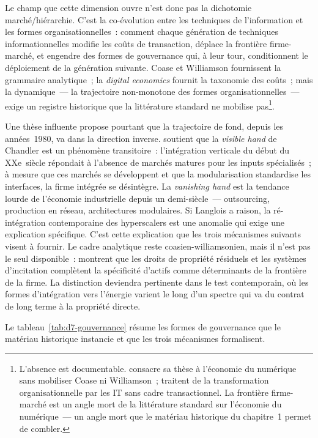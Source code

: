 Le champ que cette dimension ouvre n'est donc pas la dichotomie marché/hiérarchie. C'est la co-évolution entre les techniques de l'information et les formes organisationnelles~: comment chaque génération de techniques informationnelles modifie les coûts de transaction, déplace la frontière firme-marché, et engendre des formes de gouvernance qui, à leur tour, conditionnent le déploiement de la génération suivante. Coase et Williamson fournissent la grammaire analytique~; la \emph{digital economics} fournit la taxonomie des coûts~; mais la dynamique~--- la trajectoire non-monotone des formes organisationnelles~--- exige un registre historique que la littérature standard ne mobilise pas\footnote{L'absence est documentable. \textcite{aubouin_economie_2023} consacre sa thèse à l'économie du numérique sans mobiliser Coase ni Williamson~; \textcite{brynjolfsson_hitt_2000} traitent de la transformation organisationnelle par les IT sans cadre transactionnel. La frontière firme-marché est un angle mort de la littérature standard sur l'économie du numérique~--- un angle mort que le matériau historique du chapitre~1 permet de combler.}.

Une thèse influente propose pourtant que la trajectoire de fond, depuis les années~1980, va dans la direction inverse. \textcite{langlois_vanishing_2003} soutient que la \emph{visible hand} de Chandler est un phénomène transitoire~: l'intégration verticale du début du XXe~siècle répondait à l'absence de marchés matures pour les inputs spécialisés~; à mesure que ces marchés se développent et que la modularisation standardise les interfaces, la firme intégrée se désintègre. La \emph{vanishing hand} est la tendance lourde de l'économie industrielle depuis un demi-siècle~--- outsourcing, production en réseau, architectures modulaires. Si Langlois a raison, la ré-intégration contemporaine des hyperscalers est une anomalie qui exige une explication spécifique. C'est cette explication que les trois mécanismes suivants visent à fournir. Le cadre analytique reste coasien-williamsonien, mais il n'est pas le seul disponible~: \textcite{holmstrom_boundaries_1998} montrent que les droits de propriété résiduels \parencite{hart_property_1990} et les systèmes d'incitation complètent la spécificité d'actifs comme déterminants de la frontière de la firme. La distinction deviendra pertinente dans le test contemporain, où les formes d'intégration vers l'énergie varient le long d'un spectre qui va du contrat de long terme à la propriété directe.

Le tableau~\ref{tab:d7-gouvernance} résume les formes de gouvernance que le matériau historique instancie et que les trois mécanismes formalisent.

